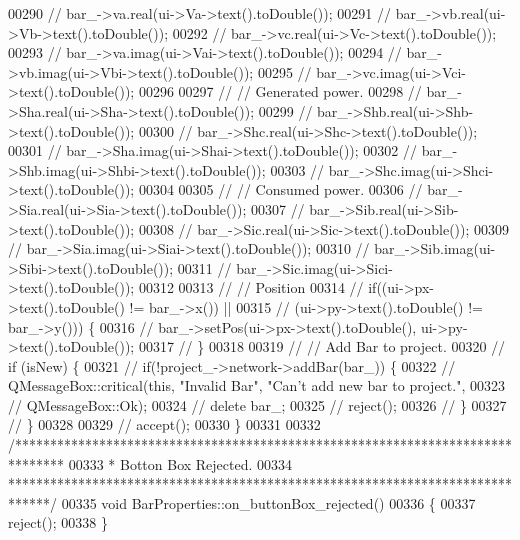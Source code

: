 \begin{DoxyCode}
00290 \textcolor{comment}{//  bar\_->va.real(ui->Va->text().toDouble());}
00291 \textcolor{comment}{//  bar\_->vb.real(ui->Vb->text().toDouble());}
00292 \textcolor{comment}{//  bar\_->vc.real(ui->Vc->text().toDouble());}
00293 \textcolor{comment}{//  bar\_->va.imag(ui->Vai->text().toDouble());}
00294 \textcolor{comment}{//  bar\_->vb.imag(ui->Vbi->text().toDouble());}
00295 \textcolor{comment}{//  bar\_->vc.imag(ui->Vci->text().toDouble());}
00296 
00297 \textcolor{comment}{//  // Generated power.}
00298 \textcolor{comment}{//  bar\_->Sha.real(ui->Sha->text().toDouble());}
00299 \textcolor{comment}{//  bar\_->Shb.real(ui->Shb->text().toDouble());}
00300 \textcolor{comment}{//  bar\_->Shc.real(ui->Shc->text().toDouble());}
00301 \textcolor{comment}{//  bar\_->Sha.imag(ui->Shai->text().toDouble());}
00302 \textcolor{comment}{//  bar\_->Shb.imag(ui->Shbi->text().toDouble());}
00303 \textcolor{comment}{//  bar\_->Shc.imag(ui->Shci->text().toDouble());}
00304 
00305 \textcolor{comment}{//  // Consumed power.}
00306 \textcolor{comment}{//  bar\_->Sia.real(ui->Sia->text().toDouble());}
00307 \textcolor{comment}{//  bar\_->Sib.real(ui->Sib->text().toDouble());}
00308 \textcolor{comment}{//  bar\_->Sic.real(ui->Sic->text().toDouble());}
00309 \textcolor{comment}{//  bar\_->Sia.imag(ui->Siai->text().toDouble());}
00310 \textcolor{comment}{//  bar\_->Sib.imag(ui->Sibi->text().toDouble());}
00311 \textcolor{comment}{//  bar\_->Sic.imag(ui->Sici->text().toDouble());}
00312 
00313 \textcolor{comment}{//  // Position}
00314 \textcolor{comment}{//  if((ui->px->text().toDouble() != bar\_->x()) ||}
00315 \textcolor{comment}{//      (ui->py->text().toDouble() != bar\_->y())) \{}
00316 \textcolor{comment}{//    bar\_->setPos(ui->px->text().toDouble(), ui->py->text().toDouble());}
00317 \textcolor{comment}{//  \}}
00318 
00319 \textcolor{comment}{//  // Add Bar to project.}
00320 \textcolor{comment}{//  if (isNew) \{}
00321 \textcolor{comment}{//    if(!project\_->network->addBar(bar\_)) \{}
00322 \textcolor{comment}{//      QMessageBox::critical(this, "Invalid Bar", "Can't add new bar to project.",}
00323 \textcolor{comment}{//                            QMessageBox::Ok);}
00324 \textcolor{comment}{//      delete bar\_;}
00325 \textcolor{comment}{//      reject();}
00326 \textcolor{comment}{//    \}}
00327 \textcolor{comment}{//  \}}
00328 
00329 \textcolor{comment}{//  accept();}
00330 \}
00331 
00332 \textcolor{comment}{/*******************************************************************************}
00333 \textcolor{comment}{ * Botton Box Rejected.}
00334 \textcolor{comment}{ ******************************************************************************/}
00335 \textcolor{keywordtype}{void} BarProperties::on\_buttonBox\_rejected()
00336 \{
00337   reject();
00338 \}
\end{DoxyCode}
